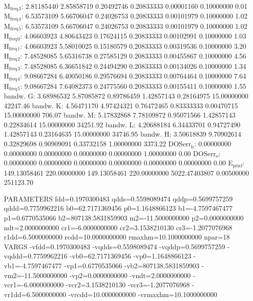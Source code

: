 \documentclass[11pt]{article}
\begin{document}
M\(_{\text{freq}}\)\(_{\text{3}}\):   2.81185440   2.85858719   0.20492746   0.20833333   0.00001160   0.10000000         0.01
M\(_{\text{freq}}\)\(_{\text{4}}\):   6.53573109   5.66706047   0.24026753   0.20833333   0.00101979   0.10000000         1.02
M\(_{\text{freq}}\)\(_{\text{5}}\):   6.53573109   5.66706047   0.24026753   0.20833333   0.00101979   0.10000000         1.02
H\(_{\text{freq}}\)\(_{\text{0}}\):   4.06603923   4.80643423   0.17624115   0.20833333   0.00102991   0.10000000         1.03
H\(_{\text{freq}}\)\(_{\text{1}}\):   4.06603923   5.58010025   0.15180579   0.20833333   0.00319536   0.10000000         3.20
H\(_{\text{freq}}\)\(_{\text{2}}\):   7.48528085   5.65316738   0.27585129   0.20833333   0.00455867   0.10000000         4.56
H\(_{\text{freq}}\)\(_{\text{3}}\):   7.48528085   6.36651842   0.24494290   0.20833333   0.00134026   0.10000000         1.34
H\(_{\text{freq}}\)\(_{\text{4}}\):   9.08667284   6.40050186   0.29576694   0.20833333   0.00764464   0.10000000         7.64
H\(_{\text{freq}}\)\(_{\text{5}}\):   9.08667284   7.64082373   0.24775560   0.20833333   0.00155411   0.10000000         1.55
bandw. G:   3.68986532   5.87085872   0.89786459   1.42857143   0.28164975  15.00000000     42247.46
bandw. K:   4.56471170   4.97424321   0.76472465   0.83333333   0.00470715  15.00000000       706.07
bandw. M:   5.17832868   7.78109872   0.95071566   1.42857143   0.22834614  15.00000000     34251.92
bandw. L:   4.20688184   6.34433701   0.94727490   1.42857143   0.23164635  15.00000000     34746.95
bandw. H:   3.50618839   9.70902614   0.32829698   0.90909091   0.33732158   1.00000000      3373.22
DOSerr\(_{\text{h}}\):   0.00000000   0.00000000   0.00000000   0.00000000   0.00000000   1.00000000         0.00
DOSerr\(_{\text{o}}\):   0.00000000   0.00000000   0.00000000   0.00000000   0.00000000   0.00000000         0.00
E\(_{\text{pris}}\)\(_{\text{f}}\): 149.13058461 220.00000000 149.13058461 220.00000000 5022.47403807 0.00500000    251123.70


PARAMETERS
 fdd=0.1970300483 qdds=0.5598089474 qddp=0.5699757259 qddd=0.7759962216 b0=62.7171369456 p0=1.1648866123 b1=-4.7597467477 p1=0.6770535066 b2=807138.5831859903 m2=-11.5000000000 p2=0.0000000000 ndt=2.0000000000 cr1=-6.0000000000 cr2=3.1538210130 cr3=-1.2077076968 r1dd=6.5000000000 rcdd=10.0000000000 rmaxhm=10.1000000000 npar=18
VARGS
    -vfdd=0.1970300483 -vqdds=0.5598089474 -vqddp=0.5699757259 -vqddd=0.7759962216 -vb0=62.7171369456 -vp0=1.1648866123 -vb1=-4.7597467477 -vp1=0.6770535066 -vb2=807138.5831859903 -vm2=-11.5000000000 -vp2=0.0000000000 -vndt=2.0000000000 -vcr1=-6.0000000000 -vcr2=3.1538210130 -vcr3=-1.2077076968 -vr1dd=6.5000000000 -vrcdd=10.0000000000 -vrmaxhm=10.1000000000 
\end{document}
